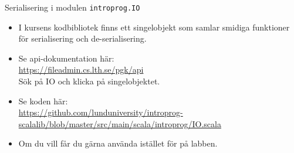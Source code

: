 \begin{Slide}{Serialisering i modulen \texttt{introprog.IO}}\SlideFontSmall
\begin{itemize}
\item I kursens kodbibliotek  finns ett singelobjekt  som samlar smidiga funktioner för serialisering och de-serialisering. 
\item Se api-dokumentation här: \\ \url{https://fileadmin.cs.lth.se/pgk/api} \\ Sök på IO och klicka på singelobjektet.
\item Se koden här:\\
\url{https://github.com/lunduniversity/introprog-scalalib/blob/master/src/main/scala/introprog/IO.scala}
\item Om du vill får du gärna använda  istället för  på labben.  
\end{itemize}
\end{Slide}
